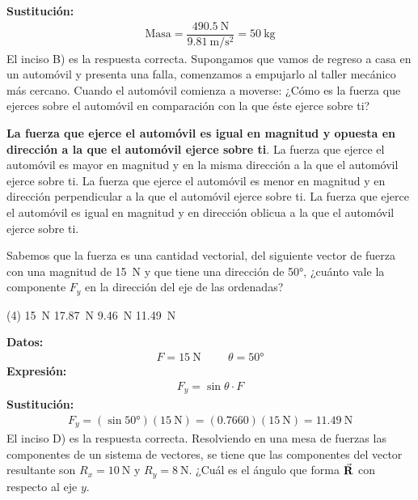 \documentclass[12pt, letter]{exam}
\begin{document}
\begin{questions}
    \textbf{Sustitución:}
    \begin{align*}
    \text{Masa} = \dfrac{\SI{490.5}{\newton}}{\SI{9.81}{\meter\per\square\second}} = \SI{50}{\kilo\gram}
    \end{align*}
    El inciso B) es la respuesta correcta.
    \question Supongamos que vamos de regreso a casa en un automóvil y presenta una falla, comenzamos a empujarlo al taller mecánico más cercano. Cuando el automóvil comienza a moverse: ¿Cómo es la fuerza que ejerces sobre el automóvil en comparación con la que éste ejerce sobre ti? 
    \begin{tasks}
        \task \textbf{La fuerza que ejerce el automóvil es igual en magnitud y opuesta en dirección a la que el automóvil ejerce sobre ti}.
        \task La fuerza que ejerce el automóvil es mayor en magnitud y en la misma dirección a la que el automóvil ejerce sobre ti.
        \task La fuerza que ejerce el automóvil es menor en magnitud y en dirección perpendicular a la que el automóvil ejerce sobre ti.
        \task La fuerza que ejerce el automóvil es igual en magnitud y en dirección oblicua a la que el automóvil ejerce sobre ti.
\end{tasks}
    \question Sabemos que la fuerza es una cantidad vectorial, del siguiente vector de fuerza con una magnitud de \SI{15}{\newton} y que tiene una dirección de \ang{50}, ¿cuánto vale la componente $F_{y}$ en la dirección del eje de las ordenadas?
    \begin{tasks}(4)
        \task \SI{15}{\newton}
        \task \SI{17.87}{\newton}
        \task \SI{9.46}{\newton}
        \task \SI{11.49}{\newton}
    \end{tasks}
    \textbf{Datos:}
    \begin{align*}
    F = \SI{15}{\newton} \hspace{1cm} \theta = \ang{50}
    \end{align*}
    \textbf{Expresión:}
    \begin{align*}
    F_{y} = \sin \theta \cdot F
    \end{align*}
    \textbf{Sustitución:}
    \begin{align*}
    F_{y} = \left( \sin \ang{50} \right) \left( \SI{15}{\newton} \right) = \left( 0.7660 \right) \left( \SI{15}{\newton} \right) = \SI{11.49}{\newton}
    \end{align*}
    El inciso D) es la respuesta correcta.
    \question Resolviendo en una mesa de fuerzas las componentes de un sistema de vectores, se tiene que las componentes del vector resultante son $R_{x} = \SI{10}{\newton}$ y $R_{y} = \SI{8}{\newton}$. ¿Cuál es el ángulo que forma $\va{R}$ con respecto al eje $y$.

\end{questions}
\end{document}
